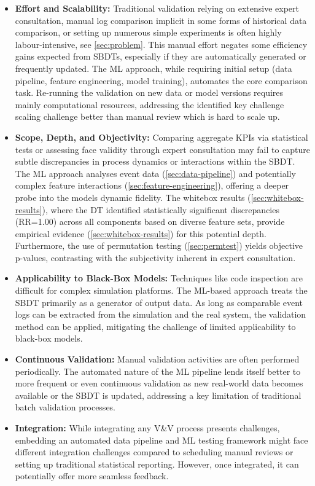 \begin{itemize}
  \item \textbf{Effort and Scalability:} Traditional validation relying on extensive expert consultation, manual log comparison implicit in some forms of historical data comparison, or setting up numerous simple experiments is often highly labour-intensive, see \autoref{sec:problem}. This manual effort negates some efficiency gains expected from SBDTs, especially if they are automatically generated or frequently updated. The ML approach, while requiring initial setup (data pipeline, feature engineering, model training), automates the core comparison task. Re-running the validation on new data or model versions requires mainly computational resources, addressing the identified key challenge scaling challenge better than manual review which is hard to scale up.

  \item \textbf{Scope, Depth, and Objectivity:} Comparing aggregate KPIs via statistical tests or assessing face validity through expert consultation may fail to capture subtle discrepancies in process dynamics or interactions within the SBDT. The ML approach analyses event data (\autoref{sec:data-pipeline}) and potentially complex feature interactions (\autoref{sec:feature-engineering}), offering a deeper probe into the models dynamic fidelity. The whitebox results (\autoref{sec:whitebox-results}), where the DT identified statistically significant discrepancies (RR=1.00) across all components based on diverse feature sets, provide empirical evidence (\autoref{sec:whitebox-results}) for this potential depth. Furthermore, the use of permutation testing (\autoref{sec:permtest}) yields objective p-values, contrasting with the subjectivity inherent in expert consultation.

  \item \textbf{Applicability to Black-Box Models:} Techniques like code inspection are difficult for complex simulation platforms. The ML-based approach treats the SBDT primarily as a generator of output data. As long as comparable event logs can be extracted from the simulation and the real system, the validation method can be applied, mitigating the challenge of limited applicability to black-box models.

  \item \textbf{Continuous Validation:} Manual validation activities are often performed periodically. The automated nature of the ML pipeline lends itself better to more frequent or even continuous validation as new real-world data becomes available or the SBDT is updated, addressing a key limitation of traditional batch validation processes.

  \item \textbf{Integration:} While integrating any V&V process presents challenges, embedding an automated data pipeline and ML testing framework might face different integration challenges compared to scheduling manual reviews or setting up traditional statistical reporting. However, once integrated, it can potentially offer more seamless feedback.
\end{itemize}

